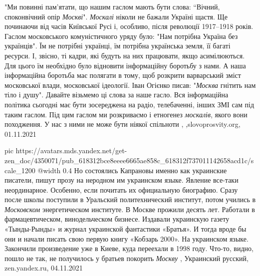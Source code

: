 "Ми повинні пам’ятати, що нашим гаслом мають бути слова: “Вічний, споконвічний
опір \emph{Москві}". \emph{Москалі} ніколи не бажали Україні щастя. Ще починаючи від часів
Київської Русі і, особливо, після революції 1917–1918 років. Гаслом
московського комуністичного уряду було: "Нам потрібна Україна без українців".
Їм не потрібні українці, їм потрібна українська земля, її багаті ресурси. І,
звісно, ті кадри, які будуть на них працювати, якщо асимілюються. Для цього їм
необхідно було відновити інформаційну боротьбу з нами. А наша інформаційна
боротьба має полягати в тому, щоб розкрити варварський зміст московської влади,
московської ідеології.  Іван Огієнко писав: "\emph{Москва} гнітить нам тіло і душу".
Давайте візьмемо ці слова за наше гасло. Вся інформаційна політика сьогодні має
бути зосереджена на радіо, телебаченні, інших ЗМІ сам під таким гаслом. Під цим
гаслом ми розкриваємо і етногенез \emph{москалів}, якого вони походження. У нас з ними
не може бути ніякої спільноти
, ,slovoprosvity.org, 01.11.2021

\ifcmt
  pic https://avatars.mds.yandex.net/get-zen_doc/4350071/pub_618312bce8eeee6665ae858c_618312f737011142658acd1c/scale_1200
  @width 0.4
\fi
Но состоялись Капрановы именно как украинские писатели, пишут прозу на неродном
им украинском языке. Явление все-таки неординарное. Особенно, если почитать их
официальную биографию.  Сразу после школы поступили в Уральский политехнический
институт, потом учились в \emph{Московском} энергетическом институте. В Москве прожили
десять лет. Работали в фармацевтическом, винодельческом бизнесе.  Издавали
украинскую газету «Тынды-Рынды» и журнал украинской фантастики «Братья». И
тогда вроде бы они и начали писать свою первую книгу «Кобзарь 2000». На
украинском языке. Закончили произведение уже в Киеве, куда переехали в 1998
году. Что-то, видно, пошло не так, не получилось у братьев покорить \emph{Москву}
, Украинский русский, zen.yandex.ru, 04.11.2021
